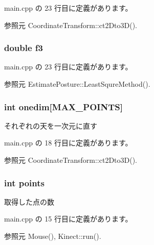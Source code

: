  main.\-cpp の 23 行目に定義があります。



参照元 Coordinate\-Transform\-::ct2\-Dto3\-D().

\subsubsection[{f3}]{\setlength{\rightskip}{0pt plus 5cm}double f3}\label{_estimate_posture_8h_a1d4774d4b1fa6156af69befbb5a9f079}


 main.\-cpp の 23 行目に定義があります。



参照元 Estimate\-Posture\-::\-Least\-Squre\-Method().

\subsubsection[{onedim}]{\setlength{\rightskip}{0pt plus 5cm}int onedim[{\bf M\-A\-X\-\_\-\-P\-O\-I\-N\-T\-S}]}\label{_estimate_posture_8h_a3176345ea8c2caf35db75e45801d0f03}


それぞれの天を一次元に直す 



 main.\-cpp の 18 行目に定義があります。



参照元 Coordinate\-Transform\-::ct2\-Dto3\-D().

\subsubsection[{points}]{\setlength{\rightskip}{0pt plus 5cm}int points}\label{_estimate_posture_8h_af7f8f4a4e39e09fdb5e9f02330ecabef}


取得した点の数 



 main.\-cpp の 15 行目に定義があります。



参照元 Mouse(), Kinect\-::run().

